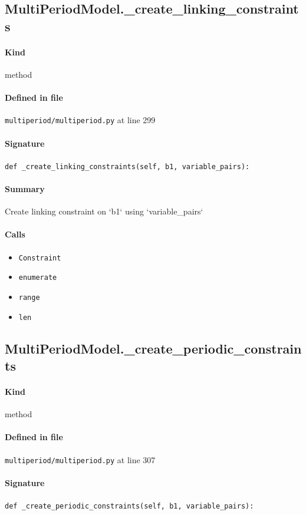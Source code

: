 \documentclass[11pt]{report}
\begin{document}
\subsection{MultiPeriodModel.\_create\_linking\_constraints}
\label{def:multiperiod-multiperiod.py:MultiPeriodModel._create_linking_constraints:L299}
\paragraph{Kind} method
\paragraph{Defined in file} \texttt{multiperiod/multiperiod.py} at line 299
\paragraph{Signature} \texttt{def \_create\_linking\_constraints(self, b1, variable\_pairs):}
\paragraph{Summary} Create linking constraint on `b1` using `variable\_pairs`
\paragraph{Calls}
\begin{itemize}[leftmargin=*]
  \item \texttt{Constraint}
  \item \texttt{enumerate}
  \item \texttt{range}
  \item \texttt{len}
\end{itemize}
\subsection{MultiPeriodModel.\_create\_periodic\_constraints}
\label{def:multiperiod-multiperiod.py:MultiPeriodModel._create_periodic_constraints:L307}
\paragraph{Kind} method
\paragraph{Defined in file} \texttt{multiperiod/multiperiod.py} at line 307
\paragraph{Signature} \texttt{def \_create\_periodic\_constraints(self, b1, variable\_pairs):}
\end{document}
